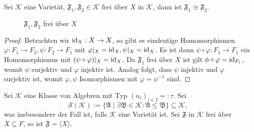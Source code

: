 \begin{proposition}
    Sei $\mathcal{K}$ eine Varietät, $\mathfrak{F}_1, \mathfrak{F}_2 \in \mathcal{K}$ frei über $X$ in $\mathcal{K}$, dann ist $\mathfrak{F}_1 \cong \mathfrak{F}_2$.
\end{proposition}

\begin{figure}[H]
    \centering
    \caption{$\mathfrak{F}_1, \mathfrak{F}_2$ frei über $X$}
\end{figure}

\begin{proof}
    Betrachten wir $\operatorname{id}_X : X \to X$, so gibt es eindeutige Homomorphismen $\varphi : F_1 \to F_2, \psi : F_2 \to F_1$ mit $\varphi \vert_X = \operatorname{id}_X, \psi \vert_X = \operatorname{id}_X$. Es ist dann $\psi \circ \varphi : F_1 \to F_1$ ein Homomorphismus mit $(\psi \circ \varphi) \vert_X = \operatorname{id}_X$. Da $\mathfrak{F}_1$ frei über $X$ ist gilt $\phi \circ \varphi = \operatorname{id}_{F_1}$, womit $\psi$ surjektiv und $\varphi$ injektiv ist. Analog folgt, dass $\psi$ injektiv und $\varphi$ surjektiv ist, womit $\varphi, \psi$ Isomorphismen mit $\varphi = \psi^{-1}$ sind.
\end{proof}


\begin{proposition}
    Sei $\mathcal{K}$ eine Klasse von Algebren mit Typ $(n_i)_{i \in I} =: \tau$. Sei
    $$ \mathcal{S}(\mathcal{K}) := \{ \mathfrak{A} \mid \exists \mathfrak{B} \in \mathcal{K}: \mathfrak{A} \leq \mathfrak{B} \} \subseteq \mathcal{K}, $$
    was insbesondere der Fall ist, falls $\mathcal{K}$ eine Varietät ist. Sei $\mathfrak{F}$ in $\mathcal{K}$ frei über $X \subseteq F$, so ist $\mathfrak{F} = \langle X \rangle$.
\end{proposition}


